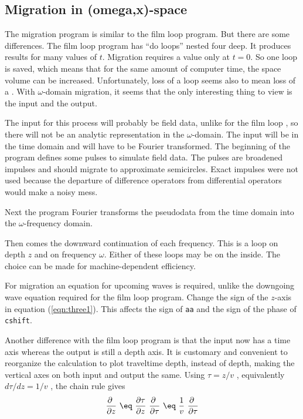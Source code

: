 \subsection{Migration in (omega,x)-space}
\par
The migration program is similar to the film loop program.
But there are some differences.
The film loop program has ``do loops'' nested four deep.
It produces results for many values of  $t$.
Migration requires a value only at  $t=0$.
So one loop is saved, which means that for the same
amount of computer time, the space volume can be increased.
Unfortunately, loss of a loop seems also to mean loss of a .
With $\omega$-domain migration, it seems that
the only interesting thing to view is the input and the output.
\par
The input for this process  
will probably be field data, unlike for the film loop ,
so there will not be an analytic representation in the  $\omega$-domain.
The input will be in the time domain and will have
to be Fourier transformed.
The beginning of the program
defines some pulses to simulate field data.
The pulses are broadened impulses and should migrate to approximate semicircles.
Exact impulses were not used because the departure of
difference operators from differential operators
would make a noisy mess.
\par
Next the program Fourier transforms the pseudodata from
the time domain into the $\omega$-frequency domain.
\par
Then comes the downward continuation of each frequency.
This is a loop on depth  $z$  and on frequency  $\omega$.
Either of these loops may be on the inside.
The choice can be made for machine-dependent efficiency.
\par
For migration an equation for upcoming waves is required,
unlike the downgoing wave equation required for the film loop program.
Change the sign of the $z$-axis in equation (\ref{eqn:three1}).
This affects the sign of {\tt aa}
and the sign of the phase of {\tt cshift}.
\par
Another difference with the film loop program
is that the input now has a time axis whereas
the output is still a depth axis.
It is customary and convenient to reorganize the calculation
to plot traveltime depth, instead of depth, making 
the vertical axes on both input and output the same.
Using  $\tau=z/v$ ,
equivalently  $d \tau / dz =1/v$ ,
the chain rule gives
\begin{equation}
{\partial \    \over \partial z} \  \eq \ 
{\partial \tau  \over \partial z} \  { \partial \    \over \partial \tau}
\  \eq \ 
{1 \over v }\  { \partial \    \over \partial \tau}
\label{eqn:three7}
\end{equation}
